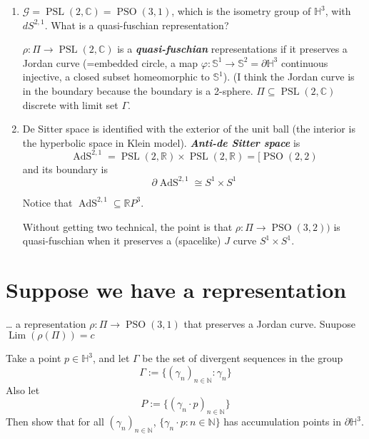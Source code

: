 \begin{enumerate}
	\item $\mathcal{G}=\operatorname{PSL}(2,\mathbb{C})=\operatorname{PSO}(3,1)$, which is the isometry group of $\mathbb{H}^3$, with $dS^{2,1}$. What is a quasi-fuschian representation?

		 \begin{defn}\leavevmode
			$\rho:\Pi\longrightarrow \operatorname{PSL}(2,\mathbb{C})$ is a \textit{\textbf{quasi-fuschian}} representations if it preserves a Jordan curve (=embedded circle, a map $\varphi:\mathbb{S}^1\longrightarrow \mathbb{S}^2=\partial \mathbb{H}^{3}$ continuous injective, a closed subset homeomorphic to $\mathbb{S}^1$). {\color{2}(I think the Jordan curve is in the boundary because the boundary is a 2-sphere.} $\Pi \subseteq \operatorname{PSL}(2,\mathbb{C})$ discrete with limit set $\Gamma$.
		\end{defn}

	\item De Sitter space is identified with the exterior of the unit ball (the interior is the hyperbolic space in Klein model). \textit{\textbf{Anti-de Sitter space}} is
		\[\operatorname{A d S}^{2,1}=\operatorname{PSL}(2,\mathbb{R})\times \operatorname{PSL}(2,\mathbb{R})=[\operatorname{PSO}(2,2)\]
		and its boundary is
		\[\partial \operatorname{A d S}^{2,1}\cong S^1\times S^1\]

		Notice that $\operatorname{AdS}^{2,1}\subseteq \mathbb{R}P^{3}$.

		Without getting two technical, the point is that $\rho:\Pi\longrightarrow \operatorname{PSO}(3,2))$ is quasi-fuschian when it preserves a (spacelike) $J$ curve $S^1\times S^1$.
\end{enumerate}

\section{Suppose we have a representation}

 … a representation $\rho:\Pi\longrightarrow \operatorname{PSO}(3,1)$ that preserves a Jordan curve. Suupose $\operatorname{Lim}(\rho(\Pi))=c$

 \begin{exercise}\leavevmode
 	Take a point $p \in\mathbb{H}^{3}$, and let $\Gamma$ be the set of divergent sequences in the group
	\[\Gamma:=\{(\gamma_{n})_{ n \in\mathbb{N}}:\gamma_n\}\]
	Also let
	 \[P:=\{(\gamma_{n}\cdot p)_{n \in \mathbb{N}}\}\]
	 Then show that for all $(\gamma_{n})_{n \in \mathbb{N}}$, $\{\gamma_n\cdot p:n \in \mathbb{N}\}$ has accumulation points in $\partial \mathbb{H}^{3}$.
 \end{exercise}

